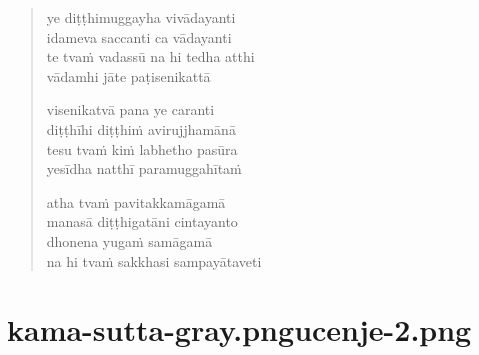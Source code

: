 \begin{verse}
ye diṭṭhimuggayha vivādayanti\\
idameva saccanti ca vādayanti\\
te tvaṁ vadassū na hi tedha atthi\\
vādamhi jāte paṭisenikattā

visenikatvā pana ye caranti\\
diṭṭhīhi diṭṭhiṁ avirujjhamānā\\
tesu tvaṁ kiṁ labhetho pasūra\\
yesīdha natthī paramuggahītaṁ

atha tvaṁ pavitakkamāgamā\\
manasā diṭṭhigatāni cintayanto\\
dhonena yugaṁ samāgamā\\
na hi tvaṁ sakkhasi sampayātaveti

\end{verse}


\chapter[Pasūra Sutta]{{kama-sutta-gray.png}{ucenje-2.png}}



